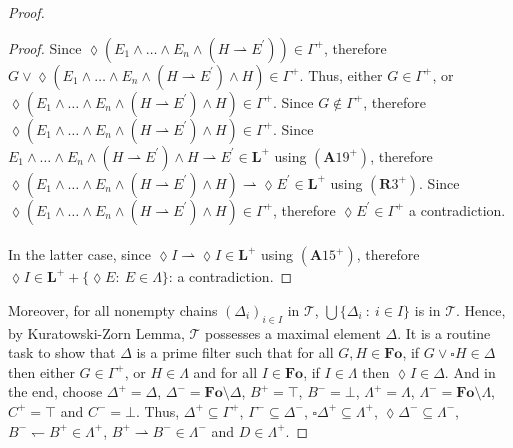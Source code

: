 \documentclass[10pt,a4paper]{amsart}
\def\Fo{\mathbf{Fo}}
\def\Formula{\mathbf{A}}
\def\L{\mathbf{L}}
\def\Rule{\mathbf{R}}
\begin{document}
\begin{proof}
\begin{proof}
Since ${\lozenge}(E_{1}{\wedge}\ldots{\wedge}E_{n}{\wedge}(H{\rightharpoonup}E^{\prime})){\in}\Gamma^{+}$, therefore $G{\vee}{\lozenge}(E_{1}{\wedge}\ldots{\wedge}E_{n}{\wedge}(H{\rightharpoonup}E^{\prime}){\wedge}H)
%
%
%
%
%
%
%
$\linebreak$
%
%
%
%
%
%
{\in}\Gamma^{+}$.
Thus, either $G{\in}\Gamma^{+}$, or ${\lozenge}(E_{1}{\wedge}\ldots{\wedge}E_{n}{\wedge}(H{\rightharpoonup}E^{\prime}){\wedge}H){\in}\Gamma^{+}$.
Since $G{\not\in}\Gamma^{+}$, therefore ${\lozenge}(E_{1}{\wedge}\ldots{\wedge}E_{n}{\wedge}(H{\rightharpoonup}E^{\prime}){\wedge}H){\in}\Gamma^{+}$.
Since $E_{1}{\wedge}\ldots{\wedge}E_{n}{\wedge}(H{\rightharpoonup}E^{\prime}){\wedge}H{\rightharpoonup}E^{\prime}{\in}
%
%
%
%
%
%
%
$\linebreak$
%
%
%
%
%
%
\L^{+}$ using $(\Formula19^{+})$, therefore ${\lozenge}(E_{1}{\wedge}\ldots{\wedge}E_{n}{\wedge}(H{\rightharpoonup}E^{\prime}){\wedge}H){\rightharpoonup}{\lozenge}E^{\prime}{\in}\L^{+}$ using $(\Rule3^{+})$.
Since ${\lozenge}(E_{1}{\wedge}\ldots{\wedge}E_{n}{\wedge}(H{\rightharpoonup}E^{\prime}){\wedge}H){\in}\Gamma^{+}$, therefore ${\lozenge}E^{\prime}{\in}\Gamma^{+}$ a contradiction.
%
%
\\
\\
%
%
In the latter case, since ${\lozenge}I{\rightharpoonup}{\lozenge}I{\in}\L^{+}$ using $(\Formula15^{+})$, therefore ${\lozenge}I{\in}\L^{+}{+}\{{\lozenge}E:\ E{\in}\Lambda\}$: a contradiction.
%
%
\medskip
%
%
\end{proof}
%
%
Moreover, for all nonempty chains $(\Delta_{i})_{i{\in}I}$ in ${\mathcal T}$, $\bigcup\{\Delta_{i}\ :\ i{\in}I\}$ is in ${\mathcal T}$.
Hence, by Kuratowski-Zorn Lemma, ${\mathcal T}$ possesses a maximal element $\Delta$.
It is a routine task to show that $\Delta$ is a prime filter such that for all $G,H{\in}\Fo$, if $G{\vee}{\square}H{\in}\Delta$ then either $G{\in}\Gamma^{+}$, or $H{\in}\Lambda$ and for all $I{\in}\Fo$, if $I{\in}\Lambda$ then ${\lozenge}I{\in}\Delta$.
And in the end, choose $\Delta^{+}{=}\Delta$, $\Delta^{-}{=}\Fo{\setminus}\Delta$, $B^{+}{=}{\top}$, $B^{-}{=}{\bot}$, $\Lambda^{+}{=}\Lambda$, $\Lambda^{-}{=}\Fo{\setminus}\Lambda$, $C^{+}{=}{\top}$ and $C^{-}{=}{\bot}$.
Thus, $\Delta^{+}{\subseteq}
%
%
%
%
%
%
%
$\linebreak$
%
%
%
%
%
%
\Gamma^{+}$, $\Gamma^{-}{\subseteq}\Delta^{-}$, ${\square}\Delta^{+}{\subseteq}\Lambda^{+}$, ${\lozenge}\Delta^{-}{\subseteq}\Lambda^{-}$, $B^{-}{\leftharpoondown}B^{+}{\in}\Lambda^{+}$, $B^{+}{\rightharpoonup}B^{-}{\in}\Lambda^{-}$ and $D{\in}\Lambda^{+}$.
%
%
\medskip
%
%
\end{proof}
\end{document}

